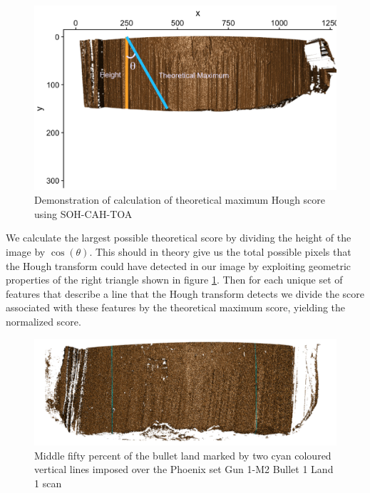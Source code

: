 \documentclass[12pt]{article}
\theoremstyle{nonumberplain}
\begin{document}
\begin{figure}[ht!]
  \centering
  \includegraphics{../images/calc-theoretical-max.png}
  \caption{Demonstration of calculation of theoretical maximum Hough score using SOH-CAH-TOA}
  \label{fig:calcmaxscore}
\end{figure}


We calculate the largest possible theoretical score by dividing the height of the image by $\cos(\theta)$. This should in theory give us the total possible pixels that the Hough transform could have detected in our image by exploiting geometric properties of the right triangle shown in figure \ref{fig:calcmaxscore}. Then for each unique set of features that describe a line that the Hough transform detects we divide the score associated with these features by the theoretical maximum score, yielding the normalized score. 
\begin{figure}[ht!]
  \centering
  \includegraphics{../images/phnx-1-m2-b1-l1-middle-fifty-demo.png}
  \caption{Middle fifty percent of the bullet land marked by two cyan coloured vertical lines imposed over the Phoenix set Gun 1-M2 Bullet 1 Land 1 scan}
  \label{fig:middlefifty}
\end{figure}
\end{document}
